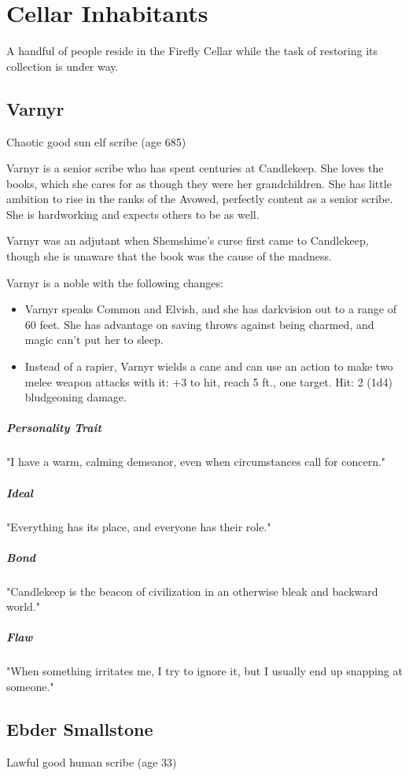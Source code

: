 \documentclass[10pt,a4paper,twoside,bg=print,twocolumn,openany,nodeprecatedcode]{dndbook}
\begin{document}
\section{Cellar Inhabitants}
A handful of people reside in the Firefly Cellar while the task of restoring its collection is under way.

\subsection{Varnyr}
Chaotic good sun elf scribe (age 685)

Varnyr is a senior scribe who has spent centuries at Candlekeep. She loves the books, which she cares for as though they were her grandchildren. She has little ambition to rise in the ranks of the Avowed, perfectly content as a senior scribe. She is hardworking and expects others to be as well.

Varnyr was an adjutant when Shemshime's curse first came to Candlekeep, though she is unaware that the book was the cause of the madness.

Varnyr is a noble with the following changes:


\begin{itemize}
\item Varnyr speaks Common and Elvish, and she has darkvision out to a range of 60 feet. She has advantage on saving throws against being charmed, and magic can't put her to sleep.
\item Instead of a rapier, Varnyr wields a cane and can use an action to make two melee weapon attacks with it: +3 to hit, reach 5 ft., one target. Hit: 2 (1d4) bludgeoning damage.
\end{itemize}

\subparagraph{Personality Trait}
"I have a warm, calming demeanor, even when circumstances call for concern."

\subparagraph{Ideal}
"Everything has its place, and everyone has their role."

\subparagraph{Bond}
"Candlekeep is the beacon of civilization in an otherwise bleak and backward world."

\subparagraph{Flaw}
"When something irritates me, I try to ignore it, but I usually end up snapping at someone."

\subsection{Ebder Smallstone}
Lawful good human scribe (age 33)
\end{document}
